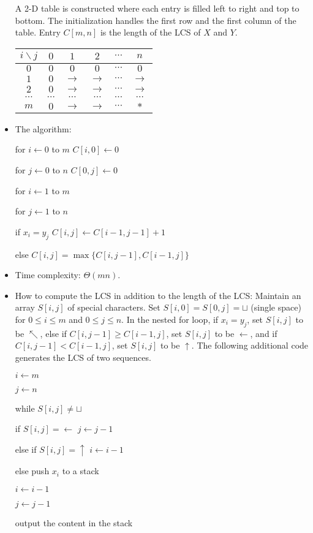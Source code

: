 \documentclass{article}
\begin{document}
\begin{itemize}
A 2-D table is constructed where each entry is filled left to
right and top to bottom. The initialization handles the first row
and the first column of the table. Entry $C[m,n]$ is the length
of the LCS of $X$ and $Y$.

\begin{center}
\begin{tabular}{c|ccccc}
$i\backslash j$ & $0$ & $1$ & $2$ & $\cdots$ & $n$\\\hline
$0$ & $0$ & $0$ & $0$ & $\cdots$ & $0$\\
$1$ & $0$ & $\rightarrow$ & $\rightarrow$ & $\cdots$ & $\rightarrow$\\
$2$ & $0$ & $\rightarrow$ & $\rightarrow$ & $\cdots$ & $\rightarrow$\\
$\cdots$ & $\cdots$ & $\cdots$ & $\cdots$ & $\cdots$ & $\cdots$\\
$m$ & $0$ & $\rightarrow$ & $\rightarrow$ & $\cdots$ & $*$\\
\end{tabular}
\end{center}

\item The algorithm:

\qquad for $i\leftarrow 0$ to $m$ $C[i,0]\leftarrow 0$

\qquad for $j\leftarrow 0$ to $n$ $C[0,j]\leftarrow 0$

\qquad for $i\leftarrow 1$ to $m$

\qquad\qquad for $j\leftarrow 1$ to $n$

\qquad\qquad\qquad if $x_i=y_j$ $C[i,j]\leftarrow C[i-1,j-1]+1$

\qquad\qquad\qquad else $C[i,j]=\max\{C[i,j-1],C[i-1,j]\}$

\item Time complexity: $\Theta(mn)$.

\item How to compute the LCS in addition to the length of the LCS:
Maintain an array $S[i,j]$ of special characters. Set $S[i,0]=S[0,j]=
\sqcup$ (single space) for $0\le i\le m$ and $0\le j\le n$.
In the nested for loop, if $x_i=y_j$, set $S[i,j]$ to be
$\nwarrow$, else if $C[i,j-1]\ge C[i-1,j]$, set $S[i,j]$ to be
$\leftarrow$, and if $C[i,j-1]<C[i-1,j]$, set $S[i,j]$ to be
$\uparrow$. The following additional code generates the
LCS of two sequences.

\qquad $i\leftarrow m$

\qquad $j\leftarrow n$

\qquad while $S[i,j]\not=\sqcup$

\qquad\qquad if $S[i,j]=\leftarrow$ $j\leftarrow j-1$

\qquad\qquad else if $S[i,j]=\uparrow$ $i\leftarrow i-1$

\qquad\qquad else push $x_i$ to a stack

\qquad\qquad\qquad $i\leftarrow i-1$

\qquad\qquad\qquad $j\leftarrow j-1$

\qquad output the content in the stack

\end{itemize}
\end{document}
